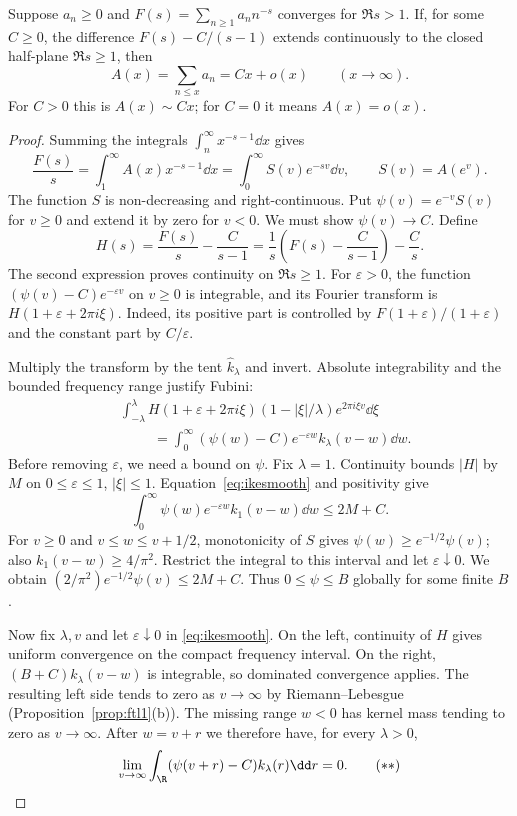 \begin{theorem}\label{thm:ikehara}
Suppose $a_n\ge0$ and $F(s)=\sum_{n\ge1}a_nn^{-s}$ converges for $\Re s>1$. If, for some $C\ge0$, the difference $F(s)-C/(s-1)$ extends continuously to the closed half-plane $\Re s\ge1$, then
\[A(x)=\sum_{n\le x}a_n=Cx+o(x)\qquad(x\to\infty).
\]
For $C>0$ this is $A(x)\sim Cx$; for $C=0$ it means $A(x)=o(x)$.
\end{theorem}
\begin{proof}
Summing the integrals $\int_n^\infty x^{-s-1}\dd x$ gives
\[\frac{F(s)}s=\int_1^\infty A(x)x^{-s-1}\dd x
 =\int_0^\infty S(v)e^{-sv}\dd v,\qquad S(v)=A(e^v).
\]
The function $S$ is non-decreasing and right-continuous. Put $\psi(v)=e^{-v}S(v)$ for $v\ge0$ and extend it by zero for $v<0$. We must show $\psi(v)\to C$. Define
\[H(s)=\frac{F(s)}s-\frac C{s-1}
 =\frac1s\left(F(s)-\frac C{s-1}\right)-\frac Cs.
\]
The second expression proves continuity on $\Re s\ge1$. For $\varepsilon>0$, the function $(\psi(v)-C)e^{-\varepsilon v}$ on $v\ge0$ is integrable, and its Fourier transform is $H(1+\varepsilon+2\pi i\xi)$. Indeed, its positive part is controlled by $F(1+\varepsilon)/(1+\varepsilon)$ and the constant part by $C/\varepsilon$.

Multiply the transform by the tent $\hat k_\lambda$ and invert. Absolute integrability and the bounded frequency range justify Fubini:
\[\begin{aligned}
&\int_{-\lambda}^{\lambda}H(1+\varepsilon+2\pi i\xi)(1-|\xi|/\lambda)e^{2\pi i\xi v}\dd\xi\\
&\hspace{1cm}=\int_0^\infty(\psi(w)-C)e^{-\varepsilon w}k_\lambda(v-w)\dd w.
\end{aligned}\tag{$*$}\label{eq:ikesmooth}
\]
Before removing $\varepsilon$, we need a bound on $\psi$. Fix $\lambda=1$. Continuity bounds $|H|$ by $M$ on $0\le\varepsilon\le1$, $|\xi|\le1$. Equation~\eqref{eq:ikesmooth} and positivity give
\[\int_0^\infty\psi(w)e^{-\varepsilon w}k_1(v-w)\dd w\le2M+C.
\]
For $v\ge0$ and $v\le w\le v+1/2$, monotonicity of $S$ gives $\psi(w)\ge e^{-1/2}\psi(v)$; also $k_1(v-w)\ge4/\pi^2$. Restrict the integral to this interval and let $\varepsilon\downarrow0$. We obtain $(2/\pi^2)e^{-1/2}\psi(v)\le2M+C$. Thus $0\le\psi\le B$ globally for some finite $B$.

Now fix $\lambda,v$ and let $\varepsilon\downarrow0$ in \eqref{eq:ikesmooth}. On the left, continuity of $H$ gives uniform convergence on the compact frequency interval. On the right, $(B+C)k_\lambda(v-w)$ is integrable, so dominated convergence applies. The resulting left side tends to zero as $v\to\infty$ by Riemann--Lebesgue (Proposition~\ref{prop:ftl1}(b)). The missing range $w<0$ has kernel mass tending to zero as $v\to\infty$. After $w=v+r$ we therefore have, for every $\lambda>0$,
\[\lim_{v\to\infty}\int_\R(\psi(v+r)-C)k_\lambda(r)\dd r=0.\tag{$**$}\label{eq:ikelimit}
\]


\end{proof}
